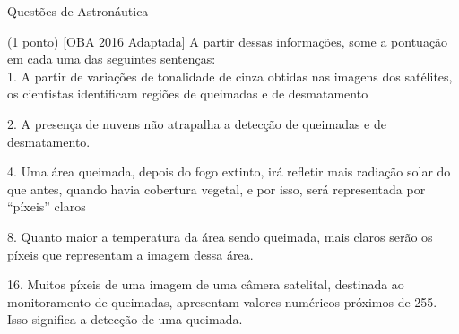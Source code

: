 \documentclass{../lista}
\begin{document}
\begin{secao}{Questões de Astronáutica}
\begin{questao}{(1 ponto) [OBA 2016 Adaptada]}
			A partir dessas informações, some a pontuação em cada uma das seguintes sentenças: \\
			
			1. A partir de variações de tonalidade de cinza obtidas nas imagens dos satélites, os cientistas identificam regiões de queimadas e de desmatamento
			
			2. A presença de nuvens não atrapalha a detecção de queimadas e de desmatamento.
			
			4. Uma área queimada, depois do fogo extinto, irá refletir mais radiação solar do que antes, quando havia cobertura vegetal, e por isso, será representada por “píxeis” claros
			
			8. Quanto maior a temperatura da área sendo queimada, mais claros serão os píxeis que representam a imagem dessa área.
			
			16. Muitos píxeis de uma imagem de uma câmera satelital, destinada ao monitoramento de queimadas, apresentam valores numéricos próximos de 255. Isso significa a detecção de uma queimada.
			
			

\end{questao}
\end{secao}
\end{document}
